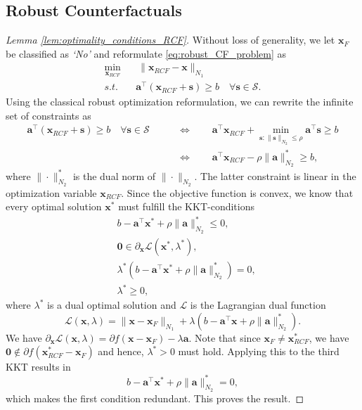 \documentclass{article}
\begin{document}
{\subsection{Robust Counterfactuals}
\begin{proof}[Lemma \ref{lem:optimality_conditions_RCF}]
Without loss of generality, we let $\bm{x}_F$ be classified as \textit{`No'} and reformulate \eqref{eq:robust_CF_problem} as
\begin{align*}
    \min_{\bm{x}_{RCF}} & \ \| \bm{x}_{RCF}-\bm{x}\|_{N_1} \\
    s.t. \quad & \bm{a}^\top (\bm{x}_{RCF} + \bm{s}) \ge b \quad \forall \bm{s}\in\mathcal S.
\end{align*}
Using the classical robust optimization reformulation, we can rewrite the infinite set of constraints as
\begin{align*}
    \bm{a}^\top (\bm{x}_{RCF} + \bm{s}) \ge b \quad \forall \bm{s}\in\mathcal S  \qquad
    &\Leftrightarrow \qquad  \bm{a}^\top \bm{x}_{RCF} + \min_{\bm{s}: \| \bm{s}\|_{N_2} \le \rho} \bm{a}^\top \bm{s} \ge b \\&
    \Leftrightarrow \qquad  \bm{a}^\top \bm{x}_{RCF} - \rho\|\bm{a}\|_{N_2}^* \ge b,
\end{align*}
where $\| \cdot \|_{N_2}^*$ is the dual norm of $\| \cdot \|_{N_2}$. The latter constraint is linear in the optimization variable $\bm{x}_{RCF}$. Since the objective function is convex, we know that every optimal solution $\bm{x}^*$ must fulfill the KKT-conditions
\begin{align*}
    & b - \bm{a}^\top \bm{x}^* + \rho\|\bm{a}\|_{N_2}^* \le 0,  \\
    &\bm{0} \in \partial_{\bm{x}}  \mathcal L(\bm{x}^*,\lambda^*), \\
    & \lambda^* (b - \bm{a}^\top \bm{x}^* + \rho\|\bm{a}\|_{N_2}^*) = 0, \\
    & \lambda^* \ge 0,
\end{align*}
where $\lambda^*$ is a dual optimal solution and $\mathcal L$ is the Lagrangian dual function
\[
\mathcal L(\bm{x},\lambda) = \| \bm{x}- \bm{x}_F\|_{N_1} + \lambda (b - \bm{a}^\top \bm{x} + \rho\|\bm{a}\|_{N_2}^*).
\]
We have $\partial_{\bm{x}}  \mathcal L(\bm{x},\lambda) = \partial f(\bm{x}-\bm{x}_F) - \lambda \bm{a}$. Note that since $\bm{x}_F \neq \bm{x}_{RCF}^*$, we have $\bm{0}\notin  \partial  f(\bm{x}_{RCF}^* - \bm{x}_F)$ and hence, $\lambda^*>0$ must hold. Applying this to the third KKT results in
\[
b - \bm{a}^\top \bm{x}^* +\rho \|\bm{a}\|_{N_2}^* = 0,
\]
which makes the first condition redundant. This proves the result.
\end{proof}

}
\end{document}
